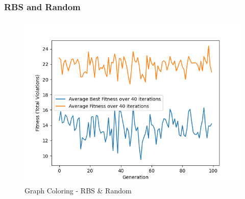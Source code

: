 \documentclass[11pt, letterpaper]{article}
\begin{document}
\subsubsection {RBS and Random}
\begin{figure}[H]
    \centering
    \includegraphics[scale = 0.6]{images/graphcoloring_rb_rd.png}
    \caption {Graph Coloring - RBS \& Random}
    \label {fig:gcRbR}
\end{figure}
\newpage
\end{document}
